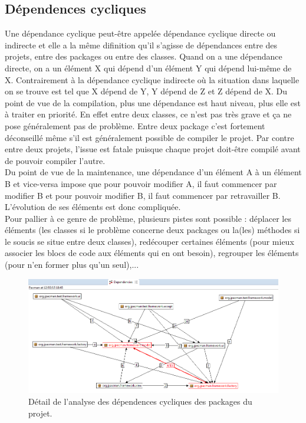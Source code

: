 \documentclass[12pt,a4paper,final]{article}
\begin{document}
\subsection{Dépendences cycliques}\label{dépendances}
Une dépendance cyclique peut-être appelée dépendance cyclique directe ou indirecte et elle a la même difinition qu'il s'agisse de dépendances entre des projets, entre des packages ou entre des classes. Quand on a une dépendance directe, on a un élément X qui dépend d’un élément Y qui dépend lui-même de X. Contrairement à la dépendance cyclique indirecte où la situation dans laquelle on se trouve est tel que X dépend de Y, Y dépend de Z et Z dépend de X.
Du point de vue de la compilation, plus une dépendance est haut niveau, plus elle est à traiter en priorité. En effet entre deux classes, ce n'est pas très grave et ça ne pose généralement pas de problème. Entre deux package c'est fortement déconseillé même s'il est généralement possible de compiler le projet. Par contre entre deux projets, l'issue est fatale puisque chaque projet doit-être compilé avant de pouvoir compiler l'autre.\\
Du point de vue de la maintenance, une dépendance d'un élément A à un élément B et vice-versa impose que pour pouvoir modifier A, il faut commencer par modifier B et pour pouvoir modifier B, il faut commencer par retravailler B. L'évolution de ses éléments est donc compliquée.\\
Pour pallier à ce genre de problème, plusieurs pistes sont possible : déplacer les éléments (les classes si le problème concerne deux packages ou la(les) méthodes si le soucis se situe entre deux classes), redécouper certaines éléments (pour mieux associer les blocs de code aux éléments qui en ont besoin), regrouper les éléments (pour n'en former plus qu'un seul),... %
\begin{figure}[!h]
	\centering
	\includegraphics[width=\textwidth]{DependenciesPackages.png}
	\caption{\label{dependenciesPackage}Détail de l'analyse des dépendences cycliques des packages du projet.}
\end{figure}
\end{document}
